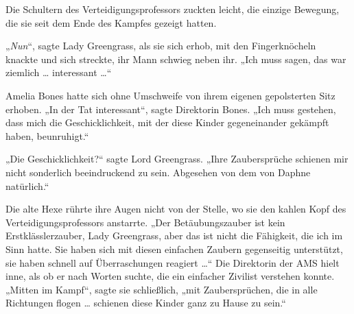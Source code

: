 Die Schultern des Verteidigungsprofessors zuckten leicht, die einzige Bewegung, die sie seit dem Ende des Kampfes gezeigt hatten.

„\emph{Nun}“, sagte Lady Greengrass, als sie sich erhob, mit den Fingerknöcheln knackte und sich streckte, ihr Mann schwieg neben ihr.
„Ich muss sagen, das war ziemlich … interessant …“

Amelia Bones hatte sich ohne Umschweife von ihrem eigenen gepolsterten Sitz erhoben.
„In der Tat interessant“, sagte Direktorin Bones.
„Ich muss gestehen, dass mich die Geschicklichkeit, mit der diese Kinder gegeneinander gekämpft haben, beunruhigt.“

„Die Geschicklichkeit?“ sagte Lord Greengrass.
„Ihre Zaubersprüche schienen mir nicht sonderlich beeindruckend zu sein. Abgesehen von dem von Daphne natürlich.“

Die alte Hexe rührte ihre Augen nicht von der Stelle, wo sie den kahlen Kopf des Verteidigungsprofessors anstarrte.
„Der Betäubungszauber ist kein Erstklässlerzauber, Lady Greengrass, aber das ist nicht die Fähigkeit, die ich im Sinn hatte. Sie haben sich mit diesen einfachen Zaubern gegenseitig unterstützt, sie haben schnell auf Überraschungen reagiert …“ Die Direktorin der AMS hielt inne, als ob er nach Worten suchte, die ein einfacher Zivilist verstehen konnte.
„Mitten im Kampf“, sagte sie schließlich, „mit Zaubersprüchen, die in alle Richtungen flogen … schienen diese Kinder ganz zu Hause zu sein.“

